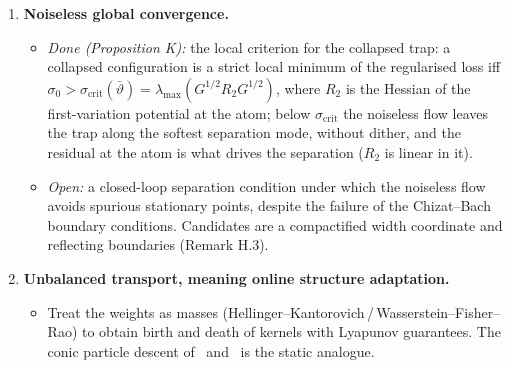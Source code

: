 \begin{enumerate}[label=\arabic*.,leftmargin=*]
\item \textbf{Noiseless global convergence.}
  \begin{itemize}
    \item \emph{Done (Proposition K):} the local criterion for the collapsed trap: a collapsed configuration is a
      strict local minimum of the regularised loss iff
      $\sigma_0>\sigma_{\mathrm{crit}}(\bar\vartheta)=\lambda_{\max}(G^{1/2}R_2G^{1/2})$, where $R_2$ is the Hessian
      of the first-variation potential at the atom; below $\sigma_{\mathrm{crit}}$ the noiseless flow leaves the
      trap along the softest separation mode, without dither, and the residual at the atom is what drives the
      separation ($R_2$ is linear in it).
    \item \emph{Open:} a closed-loop separation condition under which the noiseless flow avoids spurious stationary
      points, despite the failure of the Chizat--Bach~\cite{R29} boundary conditions. Candidates are a compactified
      width coordinate and reflecting boundaries (Remark H.3).
  \end{itemize}

\item \textbf{Unbalanced transport, meaning online structure adaptation.}
  \begin{itemize}
    \item Treat the weights as masses (Hellinger--Kantorovich\,/\,Wasserstein--Fisher--Rao) to obtain birth and death
      of kernels with Lyapunov guarantees. The conic particle descent of~\cite{R49} and~\cite{R55} is the static
      analogue.
  \end{itemize}


\end{enumerate}
